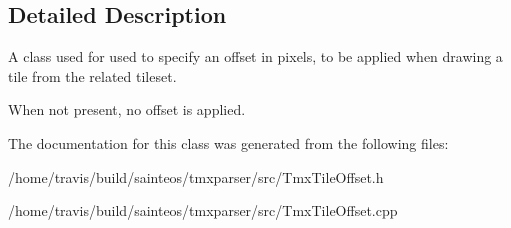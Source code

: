 \subsection{Detailed Description}
A class used for used to specify an offset in pixels, to be applied when drawing a tile from the related tileset. 

When not present, no offset is applied. 

The documentation for this class was generated from the following files\-:\begin{DoxyCompactItemize}
\item 
/home/travis/build/sainteos/tmxparser/src/Tmx\-Tile\-Offset.\-h\item 
/home/travis/build/sainteos/tmxparser/src/Tmx\-Tile\-Offset.\-cpp\end{DoxyCompactItemize}
